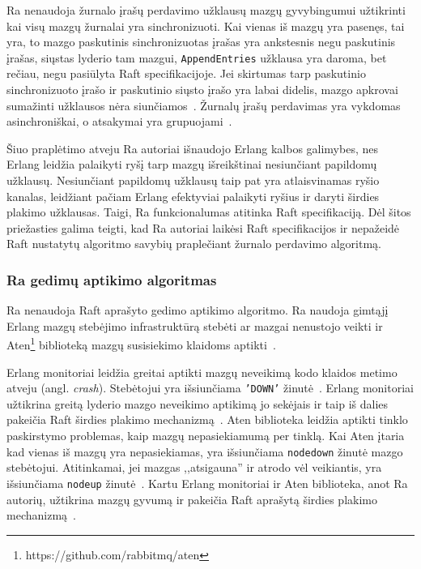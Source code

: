 \documentclass{VUMIFPSkursinis}
\begin{document}
Ra nenaudoja žurnalo įrašų perdavimo užklausų mazgų gyvybingumui užtikrinti kai visų mazgų žurnalai yra sinchronizuoti. Kai vienas iš mazgų yra pasenęs, tai yra, to mazgo paskutinis sinchronizuotas įrašas yra ankstesnis negu paskutinis įrašas, siųstas lyderio tam mazgui, \texttt{AppendEntries} užklausa yra daroma, bet rečiau, negu pasiūlyta Raft specifikacijoje. Jei skirtumas tarp paskutinio sinchronizuoto įrašo ir paskutinio siųsto įrašo yra labai didelis, mazgo apkrovai sumažinti užklausos nėra siunčiamos~\cite{rabbitmqra}. Žurnalų įrašų perdavimas yra vykdomas asinchroniškai, o atsakymai yra grupuojami~\cite{rabbitmqra}.

Šiuo praplėtimo atveju Ra autoriai išnaudojo Erlang kalbos galimybes, nes Erlang leidžia palaikyti ryšį tarp mazgų išreikštinai nesiunčiant papildomų užklausų. Nesiunčiant papildomų užklausų taip pat yra atlaisvinamas ryšio kanalas, leidžiant pačiam Erlang efektyviai palaikyti ryšius ir daryti širdies plakimo užklausas. Taigi, Ra funkcionalumas atitinka Raft specifikaciją. Dėl šitos priežasties galima teigti, kad Ra autoriai laikėsi Raft specifikacijos ir nepažeidė Raft nustatytų algoritmo savybių praplečiant žurnalo perdavimo algoritmą.      

\subsubsection{Ra gedimų aptikimo algoritmas}

Ra nenaudoja Raft aprašyto gedimo aptikimo algoritmo. Ra naudoja gimtąjį Erlang mazgų stebėjimo infrastruktūrą stebėti ar mazgai nenustojo veikti ir Aten\footnote{https://github.com/rabbitmq/aten} biblioteką mazgų susisiekimo klaidoms aptikti~\cite{rabbitmqra}.

Erlang monitoriai leidžia greitai aptikti mazgų neveikimą kodo klaidos metimo atveju (angl. \textit{crash}). Stebėtojui yra išsiunčiama \texttt{'DOWN'} žinutė~\cite{ericsson_erlang_processes_2016}. Erlang monitoriai užtikrina greitą lyderio mazgo neveikimo aptikimą jo sekėjais ir taip iš dalies pakeičia Raft širdies plakimo mechanizmą~\cite{rabbitmqra}. Aten biblioteka leidžia aptikti tinklo paskirstymo problemas, kaip mazgų nepasiekiamumą per tinklą. Kai Aten įtaria kad vienas iš mazgų yra nepasiekiamas, yra išsiunčiama \texttt{nodedown} žinutė mazgo stebėtojui. Atitinkamai, jei mazgas ,,atsigauna'' ir atrodo vėl veikiantis, yra išsiunčiama \texttt{nodeup} žinutė~\cite{rabbitmq_aten_2020}. Kartu Erlang monitoriai ir Aten biblioteka, anot Ra autorių, užtikrina mazgų gyvumą ir pakeičia Raft aprašytą širdies plakimo mechanizmą~\cite{rabbitmqra}. 
\end{document}
